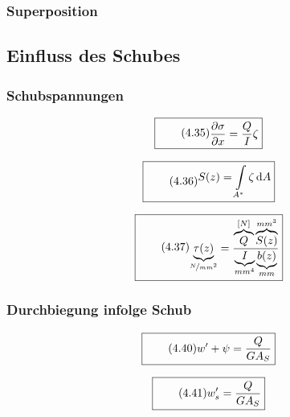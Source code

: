 \documentclass[11pt]{article}
\newcommand{\1}{ {\mathds{1}} }
\newcommand{\td}{\,\text{d}}
\begin{document}
\begin{multicols}{2}
		\subsubsection{Superposition}
		\subsection{Einfluss des Schubes}
		\subsubsection{Schubspannungen}

		\begin{equation}
			\boxed{
				\tag{4.35}
				\begin{split}
					\frac{\partial \sigma}{\partial x} = \frac{Q}{I} \zeta
				\end{split}
			}
		\end{equation}

		\begin{equation}
			\boxed{
				\tag{4.36}
				\begin{split}
					S(z) = \int\limits_{A^*} \zeta \td A
				\end{split}
			}
		\end{equation}

		\begin{equation}
			\boxed{
				\tag{4.37}
				\begin{split}
					\underbrace{\tau(z)}_{\nicefrac{N}{mm^2}} = \frac{\overbrace{Q}^{[N]}\overbrace{S(z)}^{mm^3}}{\underbrace{I}_{mm^4}\underbrace{b(z)}_{mm}}
				\end{split}
			}
		\end{equation}
		
		\subsubsection{Durchbiegung infolge Schub}

		\begin{equation}
			\boxed{
				\tag{4.40}
				\begin{split}
					w' + \psi = \frac{Q}{GA_S}
				\end{split}
			}
		\end{equation}

		\begin{equation}
			\boxed{
				\tag{4.41}
				\begin{split}
					w_s' = \frac{Q}{GA_S}
				\end{split}
			}
		\end{equation}


\end{multicols}
\end{document}
